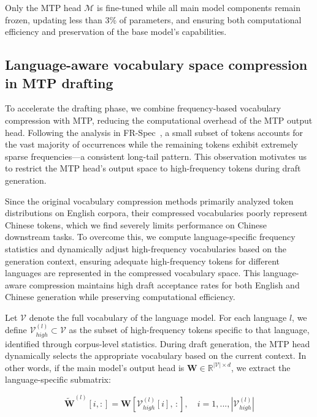 \documentclass{article} %
\begin{document}
Only the MTP head $\mathcal{M}$ is fine-tuned while all main model components remain frozen, updating less than 3\% of parameters, and ensuring both computational efficiency and preservation of the base model's capabilities.

\subsection{Language-aware vocabulary space compression in MTP drafting}

To accelerate the drafting phase, we combine frequency-based vocabulary compression with MTP, reducing the computational overhead of the MTP output head. Following the analysis in FR-Spec~\citep{zhao2025frspec}, a small subset of tokens accounts for the vast majority of occurrences while the remaining tokens exhibit extremely sparse frequencies—a consistent long-tail pattern. This observation motivates us to restrict the MTP head's output space to high-frequency tokens during draft generation. 

Since the original vocabulary compression methods primarily analyzed token distributions on English corpora, their compressed vocabularies poorly represent Chinese tokens, which we find severely limits performance on Chinese downstream tasks. To overcome this, we compute language-specific frequency statistics and dynamically adjust high-frequency vocabularies based on the generation context, ensuring adequate high-frequency tokens for different languages are represented in the compressed vocabulary space. This language-aware compression maintains high draft acceptance rates for both English and Chinese generation while preserving computational efficiency.

Let $\mathcal{V}$ denote the full vocabulary of the language model. For each language $l$, we define $\mathcal{V}_{high}^{(l)} \subset \mathcal{V}$ as the subset of high-frequency tokens specific to that language, identified through corpus-level statistics. During draft generation, the MTP head dynamically selects the appropriate vocabulary based on the current context. In other words, if the main model's output head is $\mathbf{W}\in\mathbb{R}^{|\mathcal{V}|\times d}$, we extract the language-specific submatrix:

\begin{equation}
    \tilde{\mathbf{W}}^{(l)}[i,:]=\mathbf{W}[\mathcal{V}_{high}^{(l)}[i],\,:],\quad i=1, ...,|\mathcal{V}_{high}^{(l)}|
\end{equation}
\end{document}

